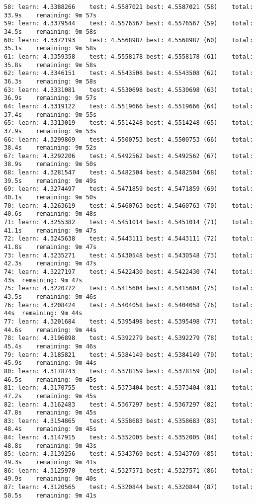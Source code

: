 \documentclass[11pt]{article}
\begin{document}
\begin{Verbatim}[commandchars=\\\{\}]
58:	learn: 4.3388266	test: 4.5587021	best: 4.5587021 (58)	total: 33.9s	remaining: 9m 57s
59:	learn: 4.3379544	test: 4.5576567	best: 4.5576567 (59)	total: 34.5s	remaining: 9m 58s
60:	learn: 4.3372193	test: 4.5568987	best: 4.5568987 (60)	total: 35.1s	remaining: 9m 58s
61:	learn: 4.3359358	test: 4.5558178	best: 4.5558178 (61)	total: 35.8s	remaining: 9m 58s
62:	learn: 4.3346151	test: 4.5543508	best: 4.5543508 (62)	total: 36.3s	remaining: 9m 58s
63:	learn: 4.3331081	test: 4.5530698	best: 4.5530698 (63)	total: 36.9s	remaining: 9m 57s
64:	learn: 4.3319122	test: 4.5519666	best: 4.5519666 (64)	total: 37.4s	remaining: 9m 55s
65:	learn: 4.3313019	test: 4.5514248	best: 4.5514248 (65)	total: 37.9s	remaining: 9m 53s
66:	learn: 4.3299869	test: 4.5500753	best: 4.5500753 (66)	total: 38.4s	remaining: 9m 52s
67:	learn: 4.3292206	test: 4.5492562	best: 4.5492562 (67)	total: 38.9s	remaining: 9m 50s
68:	learn: 4.3281547	test: 4.5482504	best: 4.5482504 (68)	total: 39.5s	remaining: 9m 49s
69:	learn: 4.3274497	test: 4.5471859	best: 4.5471859 (69)	total: 40.1s	remaining: 9m 50s
70:	learn: 4.3263619	test: 4.5460763	best: 4.5460763 (70)	total: 40.6s	remaining: 9m 48s
71:	learn: 4.3255382	test: 4.5451014	best: 4.5451014 (71)	total: 41.1s	remaining: 9m 47s
72:	learn: 4.3245638	test: 4.5443111	best: 4.5443111 (72)	total: 41.8s	remaining: 9m 47s
73:	learn: 4.3235271	test: 4.5430548	best: 4.5430548 (73)	total: 42.3s	remaining: 9m 47s
74:	learn: 4.3227197	test: 4.5422430	best: 4.5422430 (74)	total: 43s	remaining: 9m 47s
75:	learn: 4.3220772	test: 4.5415604	best: 4.5415604 (75)	total: 43.5s	remaining: 9m 46s
76:	learn: 4.3208424	test: 4.5404058	best: 4.5404058 (76)	total: 44s	remaining: 9m 44s
77:	learn: 4.3201684	test: 4.5395498	best: 4.5395498 (77)	total: 44.6s	remaining: 9m 44s
78:	learn: 4.3196898	test: 4.5392279	best: 4.5392279 (78)	total: 45.4s	remaining: 9m 46s
79:	learn: 4.3185821	test: 4.5384149	best: 4.5384149 (79)	total: 45.9s	remaining: 9m 44s
80:	learn: 4.3178743	test: 4.5378159	best: 4.5378159 (80)	total: 46.5s	remaining: 9m 45s
81:	learn: 4.3170755	test: 4.5373404	best: 4.5373404 (81)	total: 47.2s	remaining: 9m 45s
82:	learn: 4.3162483	test: 4.5367297	best: 4.5367297 (82)	total: 47.8s	remaining: 9m 45s
83:	learn: 4.3154865	test: 4.5358683	best: 4.5358683 (83)	total: 48.4s	remaining: 9m 45s
84:	learn: 4.3147915	test: 4.5352005	best: 4.5352005 (84)	total: 48.8s	remaining: 9m 43s
85:	learn: 4.3139256	test: 4.5343769	best: 4.5343769 (85)	total: 49.3s	remaining: 9m 41s
86:	learn: 4.3125970	test: 4.5327571	best: 4.5327571 (86)	total: 49.9s	remaining: 9m 40s
87:	learn: 4.3120565	test: 4.5320844	best: 4.5320844 (87)	total: 50.5s	remaining: 9m 41s

\end{Verbatim}
\end{document}
